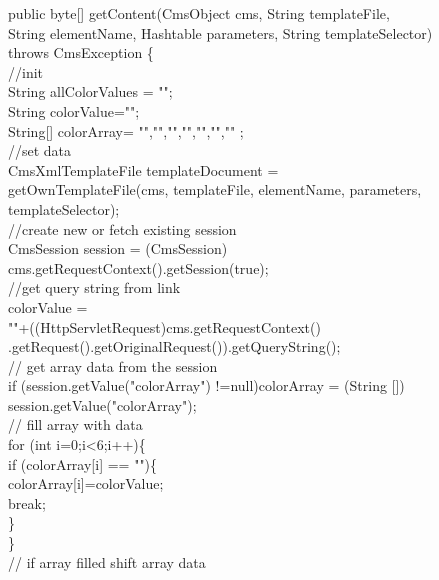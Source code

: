 \begin{java}
\jtabc        public byte[] getContent(CmsObject cms, String templateFile,\\
\jtabc        String elementName, Hashtable parameters, String templateSelector)\\
\jtabc         throws CmsException \{\\
\jtabc        //init\\
\jtabc        String allColorValues = "";\\
\jtabc        String colorValue="";\\
\jtabc        String[] colorArray= {"","","","","","",""} ;\\
\jtabc        //set data\\
\jtabc        CmsXmlTemplateFile templateDocument =\\
\jtabc        getOwnTemplateFile(cms, templateFile, elementName, parameters,\\
\jtabc        templateSelector);\\
\jtabc        //create new or fetch existing session\\
\jtabc        CmsSession session = (CmsSession)\\
\jtabc        cms.getRequestContext().getSession(true);\\
\jtabc        //get query string from link\\
\jtabc        colorValue =\\
\jtabc        ""+((HttpServletRequest)cms.getRequestContext()\\
\jtabc        .getRequest().getOriginalRequest()).getQueryString();\\
\jtabc        // get array data from the session\\
\jtabc        if (session.getValue("colorArray") !=null)colorArray = (String [])\\
\jtabc        session.getValue("colorArray");\\
\jtabc        // fill array with data\\
\jtabc        for (int i=0;i<6;i++)\{\\
\jtabd                if (colorArray[i] == "")\{\\
\jtabe                        colorArray[i]=colorValue;\\
\jtabe                        break;\\
\jtabd                \}\\
\jtabc        \}\\
\jtabc        // if array filled shift array data\\

\end{java}
